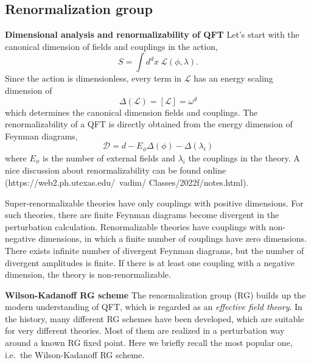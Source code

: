 \documentclass[submission, PhysLectNotes]{SciPost}
\begin{document}
\subsection{Renormalization group}
{\bf Dimensional analysis and renormalizability of QFT}
Let's start with the canonical dimension of fields and couplings in the action,
\begin{equation}
    S = \int d^d x \ \mathcal{L}(\phi, \lambda).
\end{equation}
Since the action is dimensionless, every term in $\mathcal{L}$ has an energy scaling dimension of
\begin{equation}
    \Delta(\mathcal{L}) = [\mathcal{L}] = \omega^d
\end{equation}
which determines the canonical dimension fields and couplings. The renormalizability of a QFT is directly obtained from the energy dimension of Feynman diagrams,
\begin{equation}
    \mathcal{D} = d - E_{\phi} \Delta (\phi) - \Delta (\lambda_i)
\end{equation}
where $E_{\phi}$ is the number of external fields and $\lambda_i$ the couplings in the theory. A nice discussion about renormalizability can be found online (https://web2.ph.utexas.edu/~vadim/
Classes/2022f/notes.html).

Super-renormalizable theories have only couplings with positive dimensions. For such theories, there are finite Feynman diagrams become divergent in the perturbation calculation. Renormalizable theories have couplings with non-negative dimensions, in which a finite number of couplings have zero dimensions. There exists infinite number of divergent Feynman diagrams, but the number of divergent amplitudes is finite. If there is at least one coupling with a negative dimension, the theory is non-renormalizable.

{\bf Wilson-Kadanoff RG scheme}
The renormalization group (RG) builds up the modern understanding of QFT, which is regarded as an {\it effective field theory}. In the history, many different RG schemes have been developed, which are suitable for very different theories. Most of them are realized in a perturbation way around a known RG fixed point. Here we briefly recall the most popular one, i.e.\ the Wilson-Kadanoff RG scheme.
\end{document}
